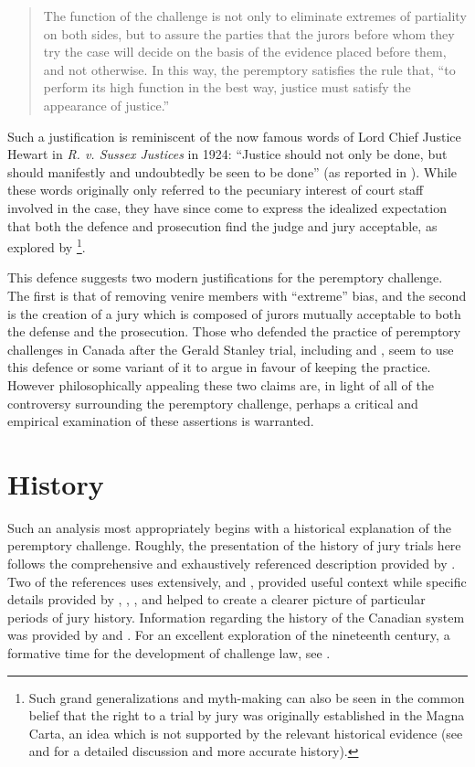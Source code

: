 \begin{quote}
\centering
The function of the challenge is not only to eliminate extremes of partiality on both sides, but to assure the parties that the
jurors before whom they try the case will decide on the basis of the evidence placed before them, and not otherwise. In this way,
the peremptory satisfies the rule that, ``to perform its high function in the best way, justice must satisfy the appearance of
justice.''
\end{quote}

Such a justification is reminiscent of the now famous words of Lord Chief Justice Hewart in \textit{R. v. Sussex Justices} in 1924:
``Justice should not only be done, but should manifestly and undoubtedly be seen to be done'' (as reported in
\cite{oakes2016}). While these words originally only referred to the pecuniary interest of court staff involved in the case, they
have since come to express the idealized expectation that both the defence and prosecution find the judge and jury acceptable, as
explored by \cite{oakes2016}\footnote{Such grand generalizations and myth-making can also be seen in the common belief that the
  right to a trial by jury was originally established in the Magna Carta, an idea which is not supported by the relevant
  historical evidence (see \cite{hoffman1997} and \cite{vandykejurysel} for a detailed discussion and more accurate history).}.

This defence suggests two modern justifications for the peremptory challenge. The first is that of removing venire members with
``extreme'' bias, and the second is the creation of a jury which is composed of jurors mutually acceptable to both the defense and
the prosecution. Those who defended the practice of peremptory challenges in Canada after the Gerald Stanley trial, including
\cite{peremparegood} and \cite{macnabproper}, seem to use this defence or some variant of it to argue in favour of keeping the
practice. However philosophically appealing these two claims are, in light of all of the controversy surrounding the peremptory
challenge, perhaps a critical and empirical examination of these assertions is warranted.

\section{History} \label{sec:history}

Such an analysis most appropriately begins with a historical explanation of the peremptory challenge. Roughly, the presentation of
the history of jury trials here follows the comprehensive and exhaustively referenced description provided by
\cite{hoffman1997}. Two of the references \citeauthor{hoffman1997} uses extensively, \cite{hansvidjudging} and
\cite{vandykejurysel}, provided useful context while specific details provided by \cite{vonmosch1921}, \cite{forsythhistory},
\cite{brown1978}, and \cite{brown2000} helped to create a clearer picture of particular periods of jury history. Information
regarding the history of the Canadian system was provided by \cite{brown2000} and \cite{petersen1993}. For an excellent
exploration of the nineteenth century, a formative time for the development of challenge law, see \cite{brown2000}.

